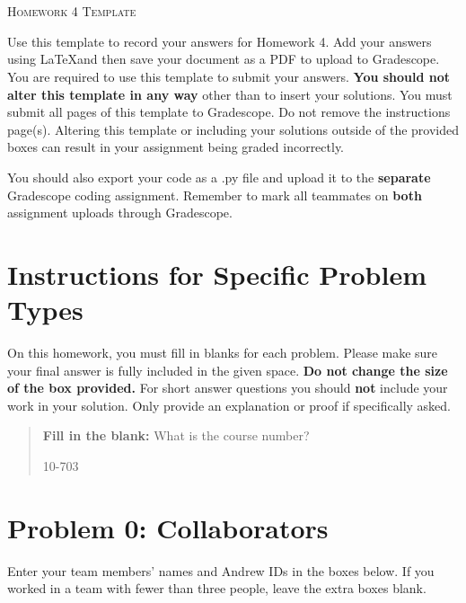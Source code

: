 \documentclass[12pt]{article}
\begin{document}
\section*{}
\begin{center}
  \centerline{\textsc{\LARGE  Homework 4 Template}}
\end{center}

Use this template to record your answers for Homework 4.  Add your answers using \LaTeX and then save your document as a PDF to upload to Gradescope.  You are required to use this template to submit your answers.  \textbf{You should not alter this template in any way} other than to insert your solutions.  You must submit all \pageref{LastPage} pages of this template to Gradescope.  Do not remove the instructions page(s).  Altering this template or including your solutions outside of the provided boxes can result in your assignment being graded incorrectly.

You should also export your code as a .py file and upload it to the \textbf{separate} Gradescope coding assignment. Remember to mark all teammates on \textbf{both} assignment uploads through Gradescope.

\section*{Instructions for Specific Problem Types}

On this homework, you must fill in blanks for each problem. Please make sure your final answer is fully included in the given space.  \textbf{Do not change the size of the box provided.}  For short answer questions you should \textbf{not} include your work in your solution.  Only provide an explanation or proof if specifically asked.

\begin{quote}
\textbf{Fill in the blank:} What is the course number?

\begin{tcolorbox}[fit,height=1cm, width=4cm, blank, borderline={1pt}{-2pt},nobeforeafter]
    \begin{center}\huge10-703\end{center}
    \end{tcolorbox}
\end{quote}

\newpage

\section*{Problem 0: Collaborators}
Enter your team members' names and Andrew IDs in the boxes below. If you worked in a team with fewer than three people, leave the extra boxes blank.
\end{document}
